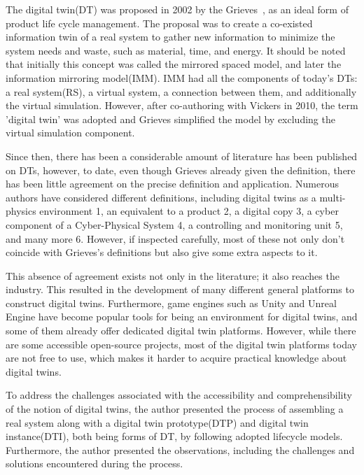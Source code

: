 \documentclass[conference]{IEEEtran}
\begin{document}
    The digital twin(DT) was proposed in 2002 by the Grieves~\cite{Originsofdigitaltwinconcept}, as an ideal form of product life cycle management. The proposal was to create a co-existed information twin of 
    a real system to gather new information to minimize the system needs and waste, such as material, time, and energy. It should be noted that initially this concept was called the mirrored spaced model, 
    and later the information mirroring model(IMM). IMM had all the components of today's DTs: a real system(RS), a virtual system,  a connection between them, and additionally the virtual simulation.
    However, after co-authoring with Vickers in 2010, the term 'digital twin' was adopted and Grieves simplified the model by excluding the virtual simulation component. 
    
    Since then, there has been a considerable amount of literature has been published on DTs,
    however, to date, even though Grieves already given the definition, there has been little agreement on the precise definition and application. 
    Numerous authors have considered different definitions, including digital twins as a multi-physics environment 1, an equivalent to a product 2, 
    a digital copy 3, a cyber component of a Cyber-Physical System 4, a controlling and monitoring unit 5, and many more 6. However, if inspected carefully,
    most of these not only don't coincide with Grieves's definitions but also give some extra aspects to it. 

    This absence of agreement exists not only in the literature; it also reaches the industry. This resulted in the development of many different 
    general platforms to construct digital twins. Furthermore, game engines such as Unity and Unreal Engine have become popular tools for being an 
    environment for digital twins, and some of them already offer dedicated digital twin platforms. 
    However, while there are some accessible open-source projects, most of the digital twin platforms today are not free to use, 
    which makes it harder to acquire practical knowledge about digital twins. 

    To address the challenges associated with the accessibility and comprehensibility of the notion of digital twins, the author presented the
    process of assembling a real system along with a digital twin prototype(DTP) and digital twin instance(DTI), both being forms of DT, 
    by following adopted lifecycle models. Furthermore, 
    the author presented the observations, including the challenges and solutions encountered during the process.
\end{document}
